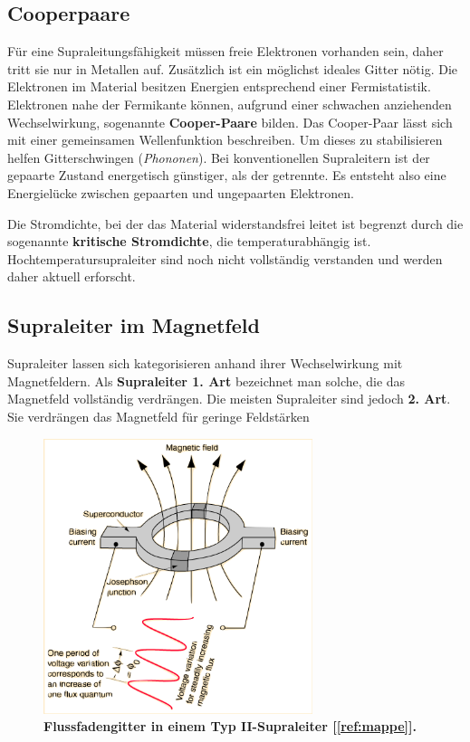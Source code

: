 \documentclass[a4paper,ngerman]{scrartcl}
\begin{document}
\subsection{Cooperpaare}

Für eine Supraleitungsfähigkeit müssen freie Elektronen vorhanden sein, daher tritt sie nur in Metallen auf.
Zusätzlich ist ein möglichst ideales Gitter nötig.
Die Elektronen im Material besitzen Energien entsprechend einer Fermistatistik.
Elektronen nahe der Fermikante können, aufgrund einer schwachen anziehenden Wechselwirkung, sogenannte \textbf{Cooper-Paare} bilden.
Das Cooper-Paar lässt sich mit einer gemeinsamen Wellenfunktion beschreiben. 
Um dieses zu stabilisieren helfen Gitterschwingen (\textit{Phononen}). 
Bei konventionellen Supraleitern ist der gepaarte Zustand energetisch günstiger, als der getrennte.
Es entsteht also eine Energielücke zwischen gepaarten und ungepaarten Elektronen. 

Die Stromdichte, bei der das Material widerstandsfrei leitet ist begrenzt durch die sogenannte \textbf{kritische Stromdichte}, die temperaturabhängig ist.
Hochtemperatursupraleiter sind noch nicht vollständig verstanden und werden daher aktuell erforscht.



\subsection{Supraleiter im Magnetfeld}

Supraleiter lassen sich kategorisieren anhand ihrer Wechselwirkung mit Magnetfeldern. Als \textbf{Supraleiter 1. Art} bezeichnet man solche, die das Magnetfeld vollständig verdrängen.  
Die meisten Supraleiter sind jedoch \textbf{2. Art}.
Sie verdrängen das Magnetfeld für geringe Feldstärken


\begin{figure}
\centering
\includegraphics[width=0.7\textwidth]{abbildungen/squide.png}
\caption[Versuchsplatz]{\textbf{Flussfadengitter in einem Typ II-Supraleiter [\ref{ref:mappe}].}}
\label{fig:typII}
\end{figure}
\end{document}
